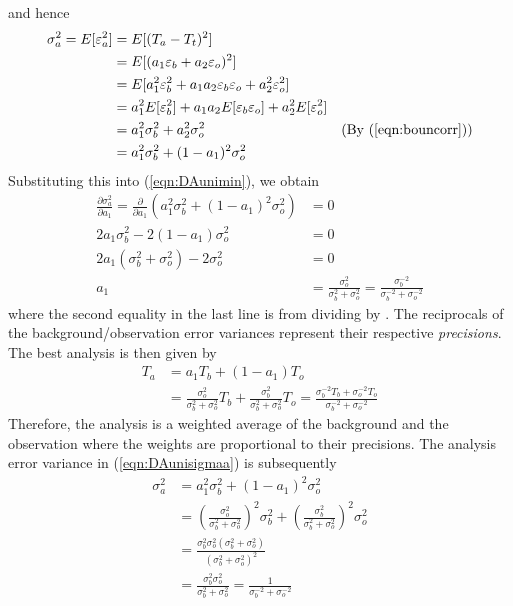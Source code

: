 and hence
\begin{align}
\sigma_a^2 = E[\varepsilon_a^2] &= E[(T_a - T_t)^2] \nonumber \\
&= E[(a_1\varepsilon_b + a_2\varepsilon_o)^2] \nonumber \\
&= E[a_1^2\varepsilon_b^2 + a_1a_2\varepsilon_b\varepsilon_o + a_2^2\varepsilon_o^2] \nonumber \\
&= a_1^2E[\varepsilon_b^2] + a_1a_2 E[\varepsilon_b\varepsilon_o] + a_2^2E[\varepsilon_o^2] \nonumber \\
&= a_1^2\sigma_b^2 + a_2^2\sigma_o^2 & \text{(By (\ref{eqn:bouncorr}))} \nonumber \\
&= a_1^2\sigma_b^2 + (1-a_1)^2\sigma_o^2 \label{eqn:DAunisigmaa}
\end{align}
Substituting this into (\ref{eqn:DAunimin}), we obtain
\begin{align}
\frac{\partial \sigma_a^2}{\partial a_1} = \frac{\partial}{\partial a_1}(a_1^2\sigma_b^2 + (1-a_1)^2\sigma_o^2) &= 0 \nonumber \\
2a_1\sigma_b^2 - 2(1-a_1)\sigma_o^2 &= 0 \nonumber \\
2a_1(\sigma_b^2 + \sigma_o^2) - 2\sigma_o^2 &= 0 \nonumber \\
a_1 &= \frac{\sigma_o^2}{\sigma_b^2 + \sigma_o^2} = \frac{\sigma_b^{-2}}{\sigma_b^{-2} + \sigma_o^{-2}}
\end{align}
where the second equality in the last line is from dividing by . The reciprocals of the background/observation error variances  represent their respective \textit{precisions}. The best analysis is then given by
\begin{align}
T_a &= a_1T_b + (1-a_1)T_o \nonumber \\
&= \frac{\sigma_o^2}{\sigma_b^2 + \sigma_o^2}T_b + \frac{\sigma_b^2}{\sigma_b^2 + \sigma_o^2}T_o =  \frac{\sigma_b^{-2} T_b + \sigma_o^{-2} T_o}{\sigma_b^{-2} + \sigma_o^{-2}} \label{eqn:univOIan}
\end{align}
Therefore, the analysis is a weighted average of the background and the observation where the weights are proportional to their precisions. The analysis error variance in (\ref{eqn:DAunisigmaa}) is subsequently
\begin{align}
\sigma_a^2 &= a_1^2\sigma_b^2 + (1-a_1)^2\sigma_o^2 \nonumber \\
&= (\frac{\sigma_o^2}{\sigma_b^2 + \sigma_o^2})^2\sigma_b^2 + (\frac{\sigma_b^2}{\sigma_b^2 + \sigma_o^2})^2\sigma_o^2 \nonumber \\
&= \frac{\sigma_b^2\sigma_o^2(\sigma_b^2 + \sigma_o^2)}{(\sigma_b^2 + \sigma_o^2)^2} \nonumber \\
&= \frac{\sigma_b^2\sigma_o^2}{\sigma_b^2 + \sigma_o^2} = \frac{1}{\sigma_b^{-2} + \sigma_o^{-2}} \label{eqn:DAunisigmaa2}
\end{align}
